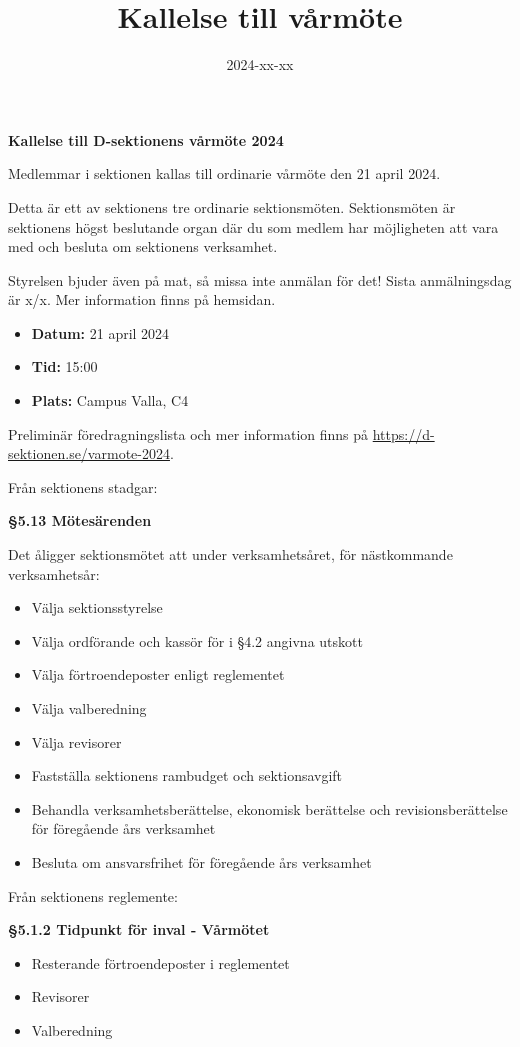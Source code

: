 \documentclass{datateknologsektionen-document}
\title{Kallelse till vårmöte}
\date{2024-xx-xx}
\begin{document}





\large
\begin{center}
  \vspace*{5mm}
  {\LARGE\bfseries Kallelse till D-sektionens vårmöte 2024}
  \vspace{2mm}
\end{center}

Medlemmar i sektionen kallas till ordinarie vårmöte den 21 april 2024. 

Detta är ett av sektionens tre ordinarie sektionsmöten. Sektionsmöten är sektionens högst beslutande organ där du som medlem har möjligheten att vara med och besluta om sektionens verksamhet. 

Styrelsen bjuder även på mat, så missa inte anmälan för det! Sista anmälningsdag är x/x. Mer information finns på hemsidan.

\vspace*{4mm}
\begin{itemize}
  \item \textbf{Datum:} 21 april 2024
  \item \textbf{Tid:} 15:00
  \item \textbf{Plats:} Campus Valla, C4
  \vspace*{4mm}
\end{itemize}

Preliminär föredragningslista och mer information finns på \url{https://d-sektionen.se/varmote-2024}.


Från sektionens stadgar:

\textbf{§5.13 Mötesärenden}

Det åligger sektionsmötet att under verksamhetsåret, för nästkommande verksamhetsår:
\begin{itemize}
  \item Välja sektionsstyrelse
  \item Välja ordförande och kassör för i §4.2 angivna utskott
  \item Välja förtroendeposter enligt reglementet
  \item Välja valberedning
  \item Välja revisorer
  \item Fastställa sektionens rambudget och sektionsavgift
  \item Behandla verksamhetsberättelse, ekonomisk berättelse och revisionsberättelse för föregående års verksamhet
\item Besluta om ansvarsfrihet för föregående års verksamhet
\end{itemize}

Från sektionens reglemente:

\textbf{§5.1.2 Tidpunkt för inval - Vårmötet}
\begin{itemize}
  \item Resterande förtroendeposter i reglementet
  \item Revisorer
  \item Valberedning
\end{itemize}
\end{document}
